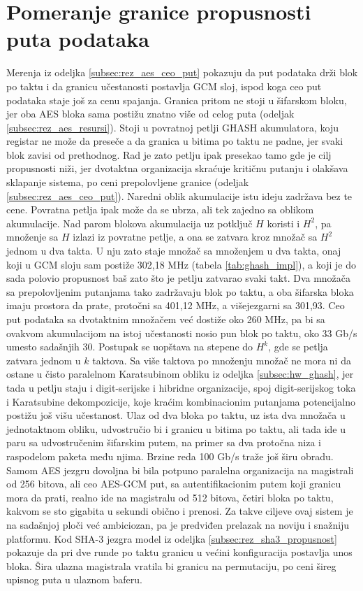\section{Pomeranje granice propusnosti puta podataka}
\label{sec:unap_granica}

Merenja iz odeljka \ref{subsec:rez_aes_ceo_put} pokazuju da put podataka drži blok po taktu i da granicu učestanosti postavlja GCM sloj, ispod koga ceo put podataka staje još za cenu spajanja. Granica pritom ne stoji u šifarskom bloku, jer oba AES bloka sama postižu znatno više od celog puta (odeljak \ref{subsec:rez_aes_resursi}). Stoji u povratnoj petlji GHASH akumulatora, koju registar ne može da preseče a da granica u bitima po taktu ne padne, jer svaki blok zavisi od prethodnog. Rad je zato petlju ipak presekao tamo gde je cilj propusnosti niži, jer dvotaktna organizacija skraćuje kritičnu putanju i olakšava sklapanje sistema, po ceni prepolovljene granice (odeljak \ref{subsec:rez_aes_ceo_put}). Naredni oblik akumulacije istu ideju zadržava bez te cene.
\smallbreak
Povratna petlja ipak može da se ubrza, ali tek zajedno sa oblikom akumulacije. Nad parom blokova akumulacija uz potključ $H$ koristi i $H^2$, pa množenje sa $H$ izlazi iz povratne petlje, a ona se zatvara kroz množač sa $H^2$ jednom u dva takta. U nju zato staje množač sa množenjem u dva takta, onaj koji u GCM sloju sam postiže 302,18 MHz (tabela \ref{tab:ghash_impl}), a koji je do sada polovio propusnost baš zato što je petlju zatvarao svaki takt. Dva množača sa prepolovljenim putanjama tako zadržavaju blok po taktu, a oba šifarska bloka imaju prostora da prate, protočni sa 401,12 MHz, a višejezgarni sa 301,93. Ceo put podataka sa dvotaktnim množačem već dostiže oko 260 MHz, pa bi sa ovakvom akumulacijom na istoj učestanosti nosio pun blok po taktu, oko 33 Gb/s umesto sadašnjih 30. Postupak se uopštava na stepene do $H^k$, gde se petlja zatvara jednom u $k$ taktova. Sa više taktova po množenju množač ne mora ni da ostane u čisto paralelnom Karatsubinom obliku iz odeljka \ref{subsec:hw_ghash}, jer tada u petlju staju i digit-serijske i hibridne organizacije, spoj digit-serijskog toka i Karatsubine dekompozicije, koje kraćim kombinacionim putanjama potencijalno postižu još višu učestanost. Ulaz od dva bloka po taktu, uz ista dva množača u jednotaktnom obliku, udvostručio bi i granicu u bitima po taktu, ali tada ide u paru sa udvostručenim šifarskim putem, na primer sa dva protočna niza i raspodelom paketa među njima. Brzine reda 100 Gb/s traže još širu obradu. Samom AES jezgru dovoljna bi bila potpuno paralelna organizacija na magistrali od 256 bitova, ali ceo AES-GCM put, sa autentifikacionim putem koji granicu mora da prati, realno ide na magistralu od 512 bitova, četiri bloka po taktu, kakvom se sto gigabita u sekundi obično i prenosi. Za takve ciljeve ovaj sistem je na sadašnjoj ploči već ambiciozan, pa je predviđen prelazak na noviju i snažniju platformu.
\smallbreak
Kod SHA-3 jezgra model iz odeljka \ref{subsec:rez_sha3_propusnost} pokazuje da pri dve runde po taktu granicu u većini konfiguracija postavlja unos bloka. Šira ulazna magistrala vratila bi granicu na permutaciju, po ceni šireg upisnog puta u ulaznom baferu.

